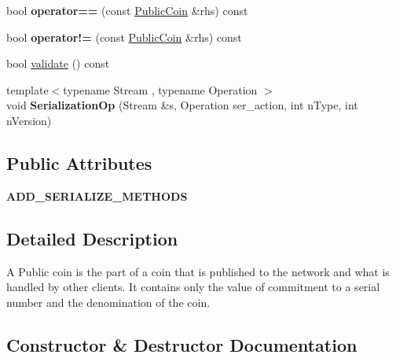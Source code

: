 \begin{DoxyCompactItemize}
bool {\bfseries operator==} (const \mbox{\hyperlink{classlibzerocoin_1_1_public_coin}{Public\+Coin}} \&rhs) const
\item 
\mbox{\label{classlibzerocoin_1_1_public_coin_a6b21e12acb24c79f5eb4688a39d637b9}} 
bool {\bfseries operator!=} (const \mbox{\hyperlink{classlibzerocoin_1_1_public_coin}{Public\+Coin}} \&rhs) const
\item 
bool \mbox{\hyperlink{classlibzerocoin_1_1_public_coin_a99e0a8bd9dcbb1ff210ea88595787d40}{validate}} () const
\item 
\mbox{\label{classlibzerocoin_1_1_public_coin_a122053f2a790814df042d8fd3eb4af2f}} 
{\footnotesize template$<$typename Stream , typename Operation $>$ }\\void {\bfseries Serialization\+Op} (Stream \&s, Operation ser\+\_\+action, int n\+Type, int n\+Version)
\end{DoxyCompactItemize}
\subsection*{Public Attributes}
\begin{DoxyCompactItemize}
\item 
\mbox{\label{classlibzerocoin_1_1_public_coin_a68f14ce9969f6299301eed4d77082066}} 
{\bfseries A\+D\+D\+\_\+\+S\+E\+R\+I\+A\+L\+I\+Z\+E\+\_\+\+M\+E\+T\+H\+O\+DS}
\end{DoxyCompactItemize}


\subsection{Detailed Description}
A Public coin is the part of a coin that is published to the network and what is handled by other clients. It contains only the value of commitment to a serial number and the denomination of the coin. 

\subsection{Constructor \& Destructor Documentation}
\mbox{\label{classlibzerocoin_1_1_public_coin_a514aa6588149238148c7cbae15181b1c}} 
